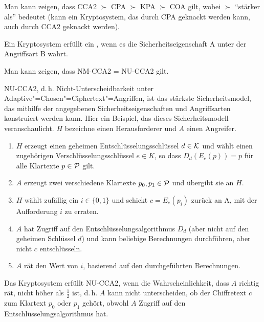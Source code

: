 \begin{remark}
 Man kann zeigen, dass CCA2 $\succ$ CPA $\succ$ KPA $\succ$ COA gilt, wobei $\succ$ \enquote{stärker als} bedeutet (\zB kann ein Kryptosystem, das durch CPA geknackt werden kann, auch durch CCA2 geknackt werden).
\end{remark}

\begin{definition}[Sicherheitsmodell]
 Ein Kryptosystem erfüllt ein , wenn es die Sicherheitseigenschaft A unter der Angriffsart B wahrt.
\end{definition}

\begin{remark}
Man kann zeigen, dass NM-CCA2 = NU-CCA2 gilt.
\end{remark}

\begin{example}
NU-CCA2, d.\,h. Nicht-Unterscheidbarkeit unter Adaptive"=Chosen"=Ciphertext"=Angriffen, ist das stärkste Sicherheitsmodel, das mithilfe der angegebenen Sicherheitseigenschaften und Angriffsarten konstruiert werden kann. Hier ein Beispiel, das dieses Sicherheitsmodell veranschaulicht. $H$ bezeichne einen Herausforderer und $A$ einen Angreifer. 
\begin{enumerate}
 \item $H$ erzeugt einen geheimen Entschlüsselungsschlüssel $d \in \mathcal K$ und wählt einen zugehörigen Verschlüsselungsschlüssel $e \in K$, so dass $D_d(E_e(p)) = p$ für alle Klartexte $p \in \mathcal P$ gilt.
 \item $A$ erzeugt zwei verschiedene Klartexte $p_0, p_1 \in \mathcal P$ und übergibt sie an $H$. 
 \item $H$ wählt zufällig ein $i \in \{0,1\}$ und schickt $c = E_e(p_i)$ zurück an A, mit der Aufforderung $i$ zu erraten. 
 \item $A$ hat Zugriff auf den Entschlüsselungsalgorithmus $D_d$ (aber nicht auf den geheimen Schlüssel $d$) und kann beliebige Berechnungen durchführen, aber nicht $c$ entschlüsseln.
 \item $A$ rät den Wert von $i$, basierend auf den durchgeführten Berechnungen. 
\end{enumerate}
Das Kryptosystem erfüllt NU-CCA2, wenn die Wahrscheinlichkeit, dass $A$ richtig rät, nicht höher als $\frac 1 2$ ist, d.\,h. $A$ kann nicht unterscheiden, ob der Chiffretext $c$ zum Klartext $p_0$ oder $p_1$ gehört, obwohl $A$ Zugriff auf den Entschlüsselungsalgorithmus hat.
\end{example}

